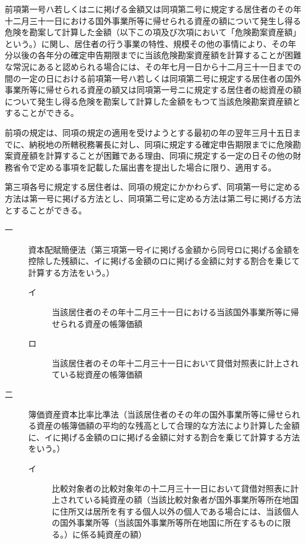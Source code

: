 \documentclass[twocolumn,a4j,10pt]{ltjtarticle}
\begin{document}
\begin{description}
\begin{description}
\begin{description}
\end{description}
\end{description}
\item[\rensuji{4}]前項第一号ハ若しくはニに掲げる金額又は同項第二号に規定する居住者のその年十二月三十一日における国外事業所等に帰せられる資産の額について発生し得る危険を勘案して計算した金額（以下この項及び次項において「危険勘案資産額」という。）に関し、居住者の行う事業の特性、規模その他の事情により、その年分以後の各年分の確定申告期限までに当該危険勘案資産額を計算することが困難な常況にあると認められる場合には、その年七月一日から十二月三十一日までの間の一定の日における前項第一号ハ若しくは同項第二号に規定する居住者の国外事業所等に帰せられる資産の額又は同項第一号ニに規定する居住者の総資産の額について発生し得る危険を勘案して計算した金額をもつて当該危険勘案資産額とすることができる。
\item[\rensuji{5}]前項の規定は、同項の規定の適用を受けようとする最初の年の翌年三月十五日までに、納税地の所轄税務署長に対し、同項に規定する確定申告期限までに危険勘案資産額を計算することが困難である理由、同項に規定する一定の日その他の財務省令で定める事項を記載した届出書を提出した場合に限り、適用する。
\item[\rensuji{6}]第三項各号に規定する居住者は、同項の規定にかかわらず、同項第一号に定める方法は第一号に掲げる方法とし、同項第二号に定める方法は第二号に掲げる方法とすることができる。
\begin{description}
\item[一]資本配賦簡便法（第三項第一号イに掲げる金額から同号ロに掲げる金額を控除した残額に、イに掲げる金額のロに掲げる金額に対する割合を乗じて計算する方法をいう。）
\begin{description}
\item[イ]当該居住者のその年十二月三十一日における当該国外事業所等に帰せられる資産の帳簿価額
\item[ロ]当該居住者のその年十二月三十一日において貸借対照表に計上されている総資産の帳簿価額
\end{description}
\item[二]簿価資産資本比率比準法（当該居住者のその年の国外事業所等に帰せられる資産の帳簿価額の平均的な残高として合理的な方法により計算した金額に、イに掲げる金額のロに掲げる金額に対する割合を乗じて計算する方法をいう。）
\begin{description}
\item[イ]比較対象者の比較対象年の十二月三十一日において貸借対照表に計上されている純資産の額（当該比較対象者が国外事業所等所在地国に住所又は居所を有する個人以外の個人である場合には、当該個人の国外事業所等（当該国外事業所等所在地国に所在するものに限る。）に係る純資産の額）

\end{description}
\end{description}
\end{description}
\end{document}
